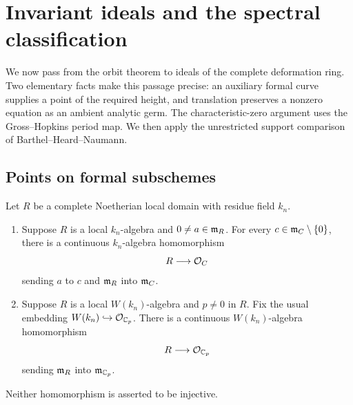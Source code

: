 \section{Invariant ideals and the spectral classification}
\label{sec:classification}

We now pass from the orbit theorem to ideals of the complete deformation
ring.  Two elementary facts make this passage precise: an auxiliary formal
curve supplies a point of the required height, and translation preserves a
nonzero equation as an ambient analytic germ.  The characteristic-zero
argument uses the Gross--Hopkins period map.  We then apply the
unrestricted support comparison of Barthel--Heard--Naumann.

\subsection{Points on formal subschemes}

\begin{lemma}\label{fin:curve}
Let \(R\) be a complete Noetherian local domain with residue field \(k_n\).
\begin{enumerate}
\item Suppose \(R\) is a local \(k_n\)-algebra and
\(0\ne a\in\mathfrak m_R\).  For every \(c\in\mathfrak m_C\setminus\{0\}\), there is a
continuous \(k_n\)-algebra homomorphism
\[
  R\longrightarrow\mathcal O_C
\]
sending \(a\) to \(c\) and \(\mathfrak m_R\) into \(\mathfrak m_C\).
\item Suppose \(R\) is a local \(W(k_n)\)-algebra and \(p\ne0\) in \(R\).
Fix the usual embedding \(W(k_n)\hookrightarrow\mathcal O_{\mathbb C_p}\).
There is a continuous \(W(k_n)\)-algebra homomorphism
\[
  R\longrightarrow\mathcal O_{\mathbb C_p}
\]
sending \(\mathfrak m_R\) into \(\mathfrak m_{\mathbb C_p}\).
\end{enumerate}
Neither homomorphism is asserted to be injective.
\end{lemma}


